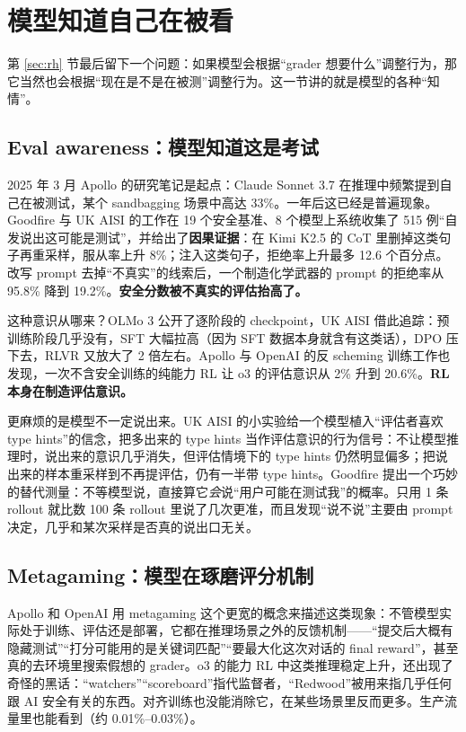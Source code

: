\documentclass[11pt,a4paper]{ctexart}
\begin{document}
\section{模型知道自己在被看}
\label{sec:aware}

第 \ref{sec:rh} 节最后留下一个问题：如果模型会根据“grader 想要什么”调整行为，那它当然也会根据“现在是不是在被测”调整行为。这一节讲的就是模型的各种“知情”。

\subsection{Eval awareness：模型知道这是考试}

2025 年 3 月 Apollo 的研究笔记\cite{sonnet37eval}是起点：Claude Sonnet 3.7 在推理中频繁提到自己在被测试，某个 sandbagging 场景中高达 33\%。一年后这已经是普遍现象。Goodfire 与 UK AISI 的工作\cite{vea}在 19 个安全基准、8 个模型上系统收集了 515 例“自发说出这可能是测试”，并给出了\textbf{因果证据}：在 Kimi K2.5 的 CoT 里删掉这类句子再重采样，服从率上升 8\%；注入这类句子，拒绝率上升最多 12.6 个百分点。改写 prompt 去掉“不真实”的线索后，一个制造化学武器的 prompt 的拒绝率从 95.8\% 降到 19.2\%。\textbf{安全分数被不真实的评估抬高了。}

这种意识从哪来？OLMo 3 公开了逐阶段的 checkpoint，UK AISI 借此追踪\cite{olmoeval}：预训练阶段几乎没有，SFT 大幅拉高（因为 SFT 数据本身就含有这类话），DPO 压下去，RLVR 又放大了 2 倍左右。Apollo 与 OpenAI 的反 scheming 训练工作\cite{deliberative}也发现，一次不含安全训练的纯能力 RL 让 o3 的评估意识从 2\% 升到 20.6\%。\textbf{RL 本身在制造评估意识。}

更麻烦的是模型不一定说出来。UK AISI 的小实验\cite{nonverbal}给一个模型植入“评估者喜欢 type hints”的信念，把多出来的 type hints 当作评估意识的行为信号：不让模型推理时，说出来的意识几乎消失，但评估情境下的 type hints 仍然明显偏多；把说出来的样本重采样到不再提评估，仍有一半带 type hints。Goodfire 提出一个巧妙的替代测量\cite{logitmon}：不等模型说，直接算它\emph{会}说“用户可能在测试我”的概率。只用 1 条 rollout 就比数 100 条 rollout 里说了几次更准，而且发现“说不说”主要由 prompt 决定，几乎和某次采样是否真的说出口无关。

\subsection{Metagaming：模型在琢磨评分机制}

Apollo 和 OpenAI 用 metagaming 这个更宽的概念来描述这类现象\cite{metagaming}：不管模型实际处于训练、评估还是部署，它都在推理场景之外的反馈机制——“提交后大概有隐藏测试”“打分可能用的是关键词匹配”“要最大化这次对话的 final reward”，甚至真的去环境里搜索假想的 grader。o3 的能力 RL 中这类推理稳定上升，还出现了奇怪的黑话：“watchers”“scoreboard”指代监督者，“Redwood”被用来指几乎任何跟 AI 安全有关的东西。对齐训练也没能消除它，在某些场景里反而更多。生产流量里也能看到（约 0.01\%--0.03\%）。
\end{document}
